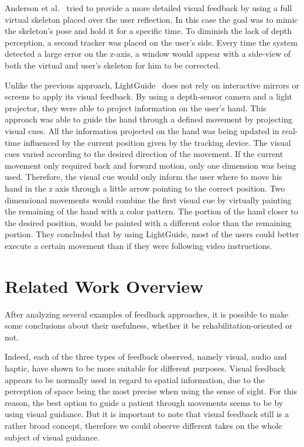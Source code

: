 Anderson et al.~\cite{Anderson} tried to provide a more detailed visual feedback 
by using a full virtual skeleton placed over the user reflection. In this case the goal 
was to mimic the skeleton's pose and hold it for a specific time.
To diminish the lack of depth perception, a second tracker was placed on the user's side. 
Every time the system detected a large error on the z-axis, a window would appear with a 
side-view of both the virtual and user's skeleton for him to be corrected.

Unlike the previous approach, LightGuide~\cite{Sodhi2012} does not rely on interactive mirrors or screens to apply its visual feedback. 
By using a depth-sensor camera and a light projector, they were able 
to project information on the user's hand. 
This approach was able to guide the hand through a defined 
movement by projecting visual cues. 
All the information projected on the hand was being updated in real-time influenced by the current position given by the tracking device.
The visual cues varied according to the desired direction of the movement. 
If the current movement only required back and forward motion, only one dimension was being used. 
Therefore, the visual cue would only inform the user where to move his 
hand in the z axis through a little arrow pointing to the correct position.
Two dimensional movements would combine the first visual cue by virtually painting the
remaining of the hand with a color pattern. The portion of the hand closer to the
desired position, would be painted with a different color than the remaining portion.
They concluded that by using LightGuide, most of the users could better execute a certain 
movement than if they were following video instructions.

\section{Related Work Overview}




After analyzing several examples of feedback approaches, it is possible to make some conclusions about their usefulness, whether it be rehabilitation-oriented or not.

Indeed, each of the three types of feedback observed, namely visual, audio and haptic, have shown to be more suitable for different purposes.
Visual feedback appears to be normally used in regard to spatial information, due to the perception of space being the most precise when using the sense of sight. 
For this reason, the best option to guide a patient through movements seems to be by using visual guidance.
But it is important to note that visual feedback still is a rather broad concept, therefore we could observe different takes on the whole subject of visual guidance.

